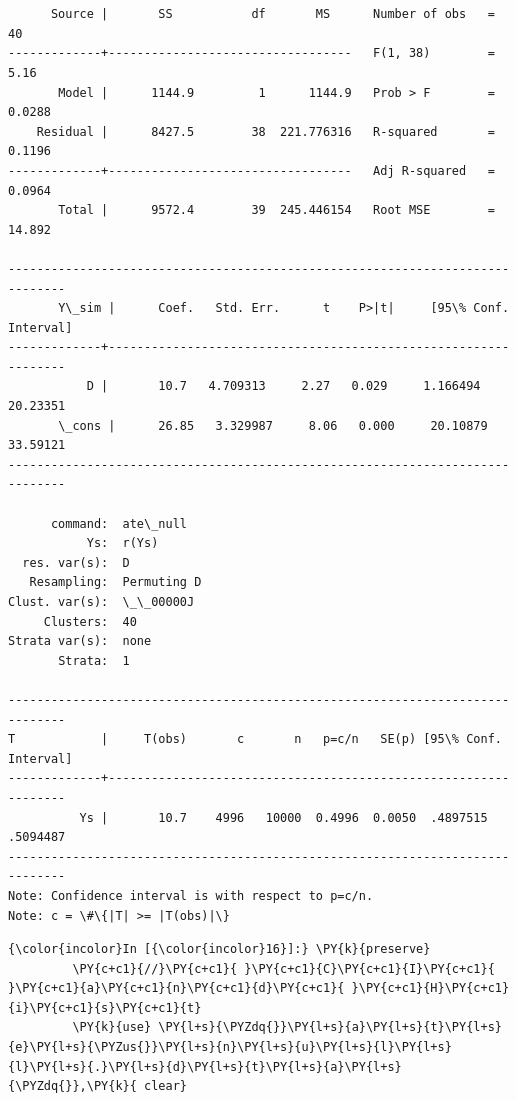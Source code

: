 \documentclass[11pt,notitlepage]{article}\usepackage[]{graphicx}\usepackage[]{color}
\makeatletter
\newenvironment{kframe}{%
 \def\at@end@of@kframe{}%
 \ifinner\ifhmode%
  \def\at@end@of@kframe{\end{minipage}}%
  \begin{minipage}{\columnwidth}%
 \fi\fi%
 \def\FrameCommand##1{\hskip\@totalleftmargin \hskip-\fboxsep
 \colorbox{shadecolor}{##1}\hskip-\fboxsep
     \hskip-\linewidth \hskip-\@totalleftmargin \hskip\columnwidth}%
 \MakeFramed {\advance\hsize-\width
   \@totalleftmargin\z@ \linewidth\hsize
   \@setminipage}}%
 {\par\unskip\endMakeFramed%
 \at@end@of@kframe}
\newenvironment{knitrout}{}{} %
\makeatother
\begin{document}
\begin{enumerate}[a)]
\begin{knitrout}
\begin{kframe}
    \begin{Verbatim}[commandchars=\\\{\}]


      Source |       SS           df       MS      Number of obs   =        40
-------------+----------------------------------   F(1, 38)        =      5.16
       Model |      1144.9         1      1144.9   Prob > F        =    0.0288
    Residual |      8427.5        38  221.776316   R-squared       =    0.1196
-------------+----------------------------------   Adj R-squared   =    0.0964
       Total |      9572.4        39  245.446154   Root MSE        =    14.892

------------------------------------------------------------------------------
       Y\_sim |      Coef.   Std. Err.      t    P>|t|     [95\% Conf. Interval]
-------------+----------------------------------------------------------------
           D |       10.7   4.709313     2.27   0.029     1.166494    20.23351
       \_cons |      26.85   3.329987     8.06   0.000     20.10879    33.59121
------------------------------------------------------------------------------

      command:  ate\_null
           Ys:  r(Ys)
  res. var(s):  D
   Resampling:  Permuting D
Clust. var(s):  \_\_00000J
     Clusters:  40
Strata var(s):  none
       Strata:  1

------------------------------------------------------------------------------
T            |     T(obs)       c       n   p=c/n   SE(p) [95\% Conf. Interval]
-------------+----------------------------------------------------------------
          Ys |       10.7    4996   10000  0.4996  0.0050  .4897515   .5094487
------------------------------------------------------------------------------
Note: Confidence interval is with respect to p=c/n.
Note: c = \#\{|T| >= |T(obs)|\}

    \end{Verbatim}

    \begin{Verbatim}[commandchars=\\\{\}]
{\color{incolor}In [{\color{incolor}16}]:} \PY{k}{preserve}
         \PY{c+c1}{//}\PY{c+c1}{ }\PY{c+c1}{C}\PY{c+c1}{I}\PY{c+c1}{ }\PY{c+c1}{a}\PY{c+c1}{n}\PY{c+c1}{d}\PY{c+c1}{ }\PY{c+c1}{H}\PY{c+c1}{i}\PY{c+c1}{s}\PY{c+c1}{t}
         \PY{k}{use} \PY{l+s}{\PYZdq{}}\PY{l+s}{a}\PY{l+s}{t}\PY{l+s}{e}\PY{l+s}{\PYZus{}}\PY{l+s}{n}\PY{l+s}{u}\PY{l+s}{l}\PY{l+s}{l}\PY{l+s}{.}\PY{l+s}{d}\PY{l+s}{t}\PY{l+s}{a}\PY{l+s}{\PYZdq{}},\PY{k}{ clear}
         

\end{Verbatim}
\end{kframe}
\end{knitrout}
\end{enumerate}
\end{document}
